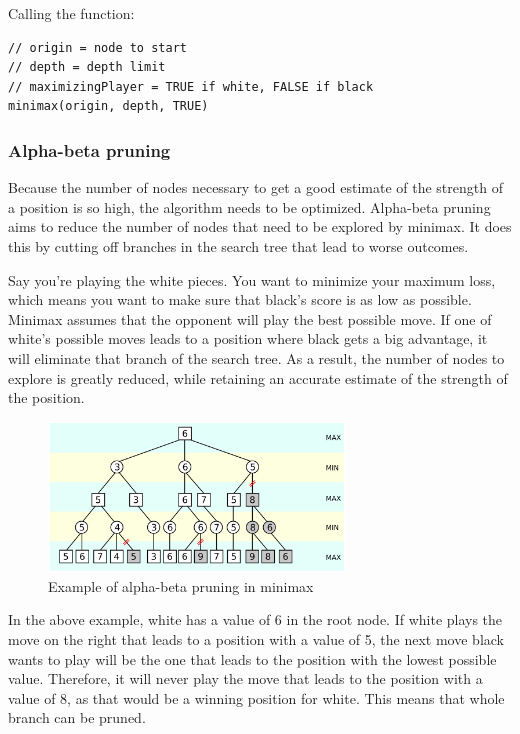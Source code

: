 \documentclass{article}
\begin{document}
Calling the function:

\begin{verbatim}
// origin = node to start
// depth = depth limit
// maximizingPlayer = TRUE if white, FALSE if black
minimax(origin, depth, TRUE)
\end{verbatim}

\subsubsection{Alpha-beta pruning}

Because the number of nodes necessary to get a good estimate of the strength of a position
is so high, the algorithm needs to be optimized. 
Alpha-beta pruning \cite{AlphaBetaPruning2022} aims to reduce the number of nodes that need to be explored by minimax.
It does this by cutting off branches in the search tree that lead to worse outcomes.

Say you're playing the white pieces. You want to minimize your maximum loss, which means 
you want to make sure that black's score is as low as possible. 
Minimax assumes that the opponent will play the best possible move. If one of white's possible moves
leads to a position where black gets a big advantage, it will eliminate that branch of the search tree.
As a result, the number of nodes to explore is greatly reduced, while retaining an accurate estimate 
of the strength of the position.

\begin{figure}[H]
    \centering
    \includegraphics[width=0.7\textwidth]{img/AB-pruning.png}
    \caption{Example of alpha-beta pruning in minimax}
\end{figure}

In the above example, white has a value of 6 in the root node. 
If white plays the move on the right that leads to a position with a value of 5, 
the next move black wants to play will be the one that leads to the position 
with the lowest possible value. Therefore, it will never play the move
that leads to the position with a value of 8, as that would be a winning position for
white. This means that whole branch can be pruned.
\end{document}
